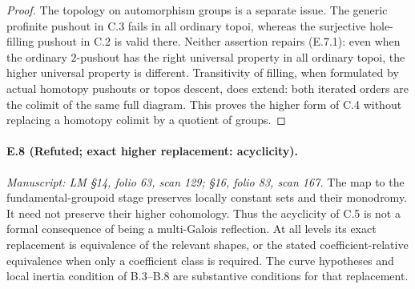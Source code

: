 \begin{proof}
The topology on automorphism groups is a separate issue. The generic profinite pushout in C.3 fails in all ordinary topoi, whereas the surjective hole-filling pushout in C.2 is valid there. Neither assertion repairs (E.7.1): even when the ordinary $2$-pushout has the right universal property in all ordinary topoi, the higher universal property is different. Transitivity of filling, when formulated by actual homotopy pushouts or topos descent, does extend: both iterated orders are the colimit of the same full diagram. This proves the higher form of C.4 without replacing a homotopy colimit by a quotient of groups. 
\end{proof}

\paragraph{E.8 (Refuted; exact higher replacement: acyclicity).}
\textit{Manuscript: LM \S14, folio 63, scan 129; \S16, folio 83, scan 167.}
The map to the fundamental-groupoid stage preserves locally constant sets and their monodromy. It need not preserve their higher cohomology. Thus the acyclicity of C.5 is not a formal consequence of being a multi-Galois reflection. At all levels its exact replacement is equivalence of the relevant shapes, or the stated coefficient-relative equivalence when only a coefficient class is required. The curve hypotheses and local inertia condition of B.3--B.8 are substantive conditions for that replacement.

